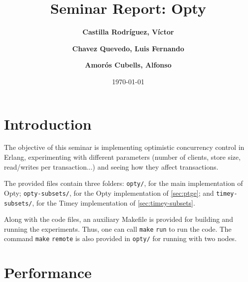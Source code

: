 \documentclass[a4paper, 10pt]{article}
\title{Seminar Report: Opty}
\author{\textbf{Castilla Rodríguez, Víctor}\and \textbf{Chavez Quevedo, Luis Fernando}\and \textbf{Amorós Cubells, Alfonso}
}
\date{\normalsize\today{}}
\begin{document}
\maketitle




\section{Introduction}



The objective of this seminar is implementing  optimistic concurrency control in Erlang, experimenting with different parameters (number of clients, store size, read/writes per transaction...) and seeing how they affect transactions.

The provided files contain three folders: \texttt{opty/}, for the main implementation of Opty; \texttt{opty-subsets/}, for the Opty implementation of \cref{sec:ptge}; and \texttt{timey-subsets/}, for the Timey implementation of \cref{sec:timey-subsets}.

Along with the code files, an auxiliary Makefile is provided for building and
running the experiments. Thus, one can call \texttt{make} \texttt{run} to run the code.
The command \texttt{make} \texttt{remote} is also provided in \texttt{opty/} for running with two nodes.

\section{Performance} \label{sec:performance}

\end{document}
